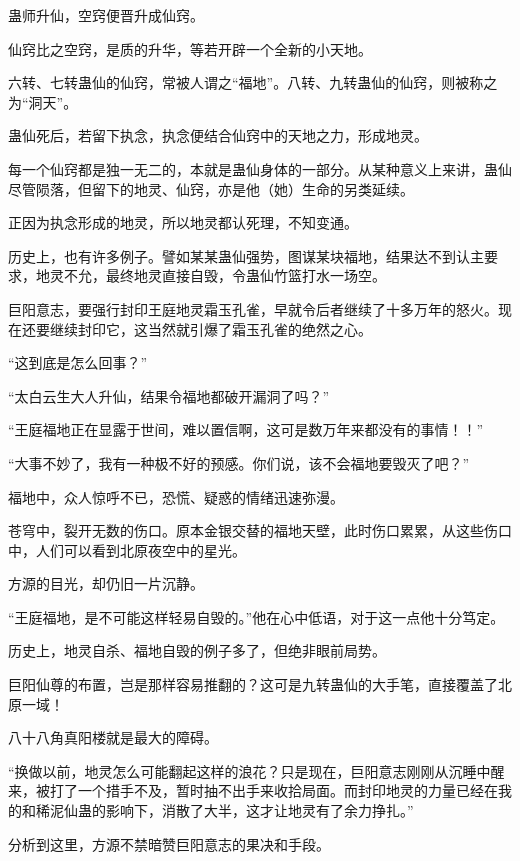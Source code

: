 
\begin{this_body}

蛊师升仙，空窍便晋升成仙窍。

仙窍比之空窍，是质的升华，等若开辟一个全新的小天地。

六转、七转蛊仙的仙窍，常被人谓之“福地”。八转、九转蛊仙的仙窍，则被称之为“洞天”。

蛊仙死后，若留下执念，执念便结合仙窍中的天地之力，形成地灵。

每一个仙窍都是独一无二的，本就是蛊仙身体的一部分。从某种意义上来讲，蛊仙尽管陨落，但留下的地灵、仙窍，亦是他（她）生命的另类延续。

正因为执念形成的地灵，所以地灵都认死理，不知变通。

历史上，也有许多例子。譬如某某蛊仙强势，图谋某块福地，结果达不到认主要求，地灵不允，最终地灵直接自毁，令蛊仙竹篮打水一场空。

巨阳意志，要强行封印王庭地灵霜玉孔雀，早就令后者继续了十多万年的怒火。现在还要继续封印它，这当然就引爆了霜玉孔雀的绝然之心。

“这到底是怎么回事？”

“太白云生大人升仙，结果令福地都破开漏洞了吗？”

“王庭福地正在显露于世间，难以置信啊，这可是数万年来都没有的事情！！”

“大事不妙了，我有一种极不好的预感。你们说，该不会福地要毁灭了吧？”

福地中，众人惊呼不已，恐慌、疑惑的情绪迅速弥漫。

苍穹中，裂开无数的伤口。原本金银交替的福地天壁，此时伤口累累，从这些伤口中，人们可以看到北原夜空中的星光。

方源的目光，却仍旧一片沉静。

“王庭福地，是不可能这样轻易自毁的。”他在心中低语，对于这一点他十分笃定。

历史上，地灵自杀、福地自毁的例子多了，但绝非眼前局势。

巨阳仙尊的布置，岂是那样容易推翻的？这可是九转蛊仙的大手笔，直接覆盖了北原一域！

八十八角真阳楼就是最大的障碍。

“换做以前，地灵怎么可能翻起这样的浪花？只是现在，巨阳意志刚刚从沉睡中醒来，被打了一个措手不及，暂时抽不出手来收拾局面。而封印地灵的力量已经在我的和稀泥仙蛊的影响下，消散了大半，这才让地灵有了余力挣扎。”

分析到这里，方源不禁暗赞巨阳意志的果决和手段。


\end{this_body}
